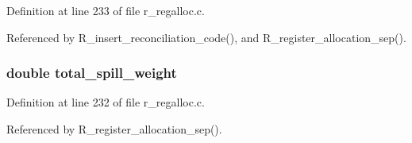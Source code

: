 Definition at line 233 of file r\_\-regalloc.c.

Referenced by R\_\-insert\_\-reconciliation\_\-code(), and R\_\-register\_\-allocation\_\-sep().
\subsubsection{\setlength{\rightskip}{0pt plus 5cm}double \bf{total\_\-spill\_\-weight}}\label{r__regalloc_8h_d11ed0e43ea906b2f8df38b402967969}




Definition at line 232 of file r\_\-regalloc.c.

Referenced by R\_\-register\_\-allocation\_\-sep().